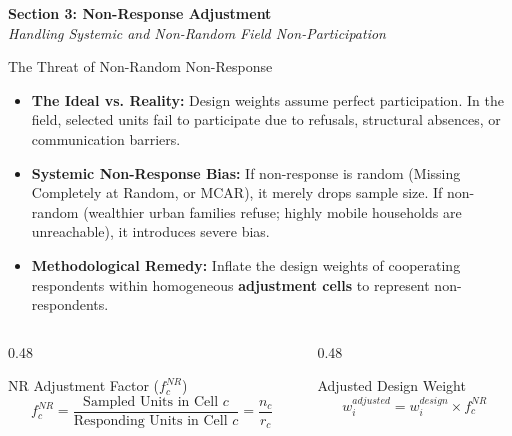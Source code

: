 \documentclass[10pt, aspectratio=169]{beamer}
\begin{document}
{
\begin{frame}[plain, c]
  \centering
  \color{white}
  \Huge \textbf{Section 3: Non-Response Adjustment} \\
  \vspace{0.4cm}
  \Large \textit{Handling Systemic and Non-Random Field Non-Participation}
\end{frame}
}

\begin{frame}{The Threat of Non-Random Non-Response}
  \begin{itemize}
    \item \textbf{The Ideal vs. Reality:} Design weights assume perfect participation. In the field, selected units fail to participate due to refusals, structural absences, or communication barriers.
    \item \textbf{Systemic Non-Response Bias:} If non-response is random (Missing Completely at Random, or MCAR), it merely drops sample size. If non-random (wealthier urban families refuse; highly mobile households are unreachable), it introduces severe bias.
    \item \textbf{Methodological Remedy:} Inflate the design weights of cooperating respondents within homogeneous \textbf{adjustment cells} to represent non-respondents.
  \end{itemize}

  \begin{columns}[T]
    \begin{column}{0.48\textwidth}
      \begin{block}{NR Adjustment Factor ($f_c^{NR}$)}
        \begin{equation}
          f_c^{NR} = \frac{\text{Sampled Units in Cell } c}{\text{Responding Units in Cell } c} = \frac{n_c}{r_c}
        \end{equation}
      \end{block}
    \end{column}
    \begin{column}{0.48\textwidth}
      \begin{block}{Adjusted Design Weight}
        \begin{equation}
          w_i^{adjusted} = w_i^{design} \times f_c^{NR}
        \end{equation}
      \end{block}
    \end{column}
  \end{columns}
\end{frame}
\end{document}
